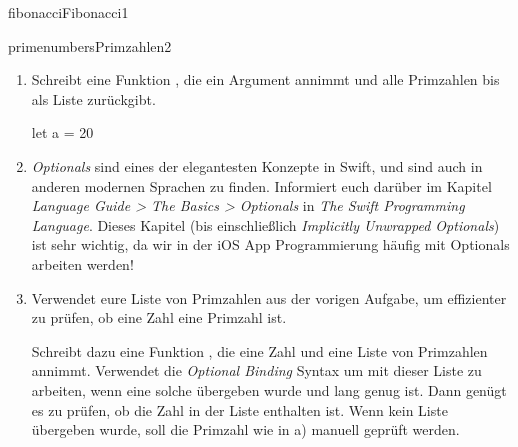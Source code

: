 \documentclass[parskip=half, final]{scrreprt}
\begin{document}
\begin{lecture}
\begin{exc}
\begin{excitem}{fibonacci}{Fibonacci}{1}
\end{excitem}

\begin{excitem}{primenumbers}{Primzahlen}{2}


\begin{enumerate}

\item Schreibt eine Funktion , die ein Argument  annimmt und alle Primzahlen bis  als Liste \swiftinline{[Int]} zurückgibt.


\begin{swiftcode}
let a = 20%
\end{swiftcode}

\item \emph{Optionals} sind eines der elegantesten Konzepte in Swift, und sind auch in anderen modernen Sprachen zu finden. Informiert euch darüber im Kapitel \emph{Language Guide > The Basics > Optionals} in \emph{The Swift Programming Language}. Dieses Kapitel (bis einschließlich \emph{Implicitly Unwrapped Optionals}) ist sehr wichtig, da wir in der iOS App Programmierung häufig mit Optionals arbeiten werden!

\item Verwendet eure Liste von Primzahlen aus der vorigen Aufgabe, um effizienter zu prüfen, ob eine Zahl eine Primzahl ist.

Schreibt dazu eine Funktion , die eine Zahl  und eine  Liste von Primzahlen  annimmt. Verwendet die \emph{Optional Binding} Syntax  um mit dieser Liste zu arbeiten, wenn eine solche übergeben wurde und lang genug ist. Dann genügt es zu prüfen, ob die Zahl in der Liste enthalten ist. Wenn kein Liste übergeben wurde, soll die Primzahl wie in a) manuell geprüft werden.

\end{enumerate}
\end{excitem}
\end{exc}
\end{lecture}
\end{document}
